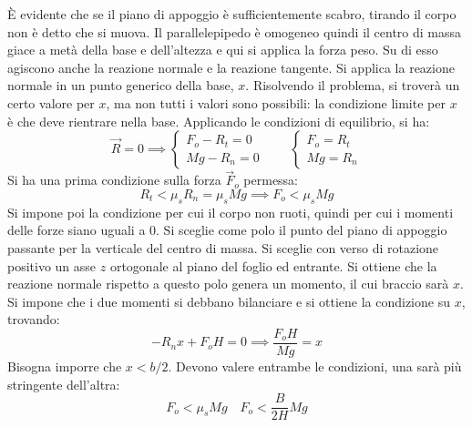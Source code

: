 \documentclass[10pt,a4paper]{book}
\begin{document}
\begin{figure}[htpb]
\end{figure}
\FloatBarrier
È evidente che se il piano di appoggio è sufficientemente scabro, tirando il corpo non è detto che si muova. Il parallelepipedo è omogeneo quindi il centro di massa giace a metà della base e dell'altezza e qui si applica la forza peso. Su di esso agiscono anche la reazione normale e la reazione tangente. Si applica la reazione normale in un punto generico della base, $x$.
Risolvendo il problema, si troverà un certo valore per $x$, ma non tutti i valori sono possibili: la condizione limite per $x$ è che deve rientrare nella base. Applicando le condizioni di equilibrio, si ha:
\[
	\vec{R} = 0 \implies \left\{ \begin{array}{l}
	 	F_o - R_t   = 0 \\
		Mg-R_n = 0
	\end{array} \right.
	\qquad
	\left\{ \begin{array}{l}
	 	F_o = R_t \\
		Mg = R_n
	\end{array} \right.
\]
Si ha una prima condizione sulla forza $\vec{F}_o$ permessa:
\[
	R_t < \mu_s R_n = \mu_s Mg \implies F_o < \mu_s Mg
\]
Si impone poi la condizione per cui il corpo non ruoti, quindi per cui i momenti delle forze siano uguali a $0$. Si sceglie come polo il punto del piano di appoggio passante per la verticale del centro di massa. Si sceglie con verso di rotazione positivo un asse $z$ ortogonale al piano del foglio ed entrante. Si ottiene che la reazione normale rispetto a questo polo genera un momento, il cui braccio sarà $x$. Si impone che i due momenti si debbano bilanciare e si ottiene la condizione su $x$, trovando:
\[
	-R_n x + F_o H = 0 \implies  \frac{F_o H}{Mg} = x
\]
Bisogna imporre che $x<b/2$. Devono valere entrambe le condizioni, una sarà più stringente dell'altra:
\[
	F_o < \mu_s Mg \quad F_o < \frac{B}{2H}Mg
\]
\end{document}
